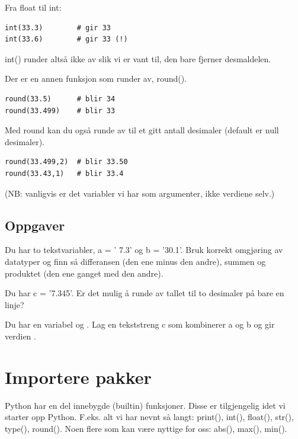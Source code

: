 {Fra float til int:
\begin{lstlisting}
int(33.3)        # gir 33
int(33.6)        # gir 33 (!)
\end{lstlisting}

int() runder altså ikke av slik vi er vant til, den bare fjerner desmaldelen. 

Der er en annen funksjon som runder av, round().

\begin{lstlisting}
round(33.5)      # blir 34 
round(33.499)    # blir 33
\end{lstlisting}

Med round kan du også runde av til et gitt antall desimaler (default er null desimaler).
\begin{lstlisting}
round(33.499,2)  # blir 33.50
round(33.43,1)   # blir 33.4
\end{lstlisting}

(NB: vanligvis er det variabler vi har som argumenter, ikke verdiene selv.)  

\subsection{Oppgaver}

\begin{question}
Du har to tekstvariabler, a = ' 7.3' og b = '30.1'. Bruk korrekt omgjøring av datatyper og finn så differansen (den ene minus den andre),
summen og produktet (den ene ganget med den andre).
\end{question}

\begin{question}
Du har c = '7.345'. Er det mulig å runde av tallet til to desimaler på bare en linje?
\end{question}

\begin{question}
Du har en variabel  og . Lag en tekststreng c som kombinerer a og b og gir verdien .
\end{question}

\section{Importere pakker}

Python har en del innebygde (builtin) funksjoner. Disse er tilgjengelig idet vi starter opp Python. F.eks. alt vi har nevnt så langt: print(), int(), float(), str(), type(), round(). Noen flere som kan være nyttige for oss: abs(), max(), min().

}
